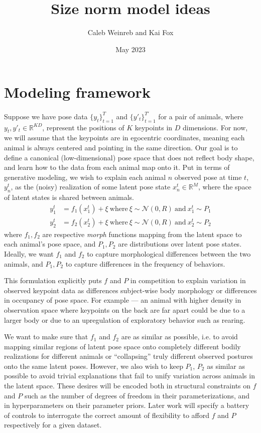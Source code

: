 \documentclass{article}         %
\title{Size norm model ideas}
\author{Caleb Weinreb and Kai Fox}
\date{May 2023}
\begin{document}
\maketitle

\section{Modeling framework}
\label{sec:model-fwk}

Suppose we have pose data $\{y_t\}_{t=1}^T$ and $\{y'_t\}_{t=1}^{T'}$ for a pair of animals, where $y_t, y'_t \in \mathbb{R}^{KD}$, represent the positions of $K$ keypoints in $D$ dimensions. For now, we will assume that the keypoints are in egocentric coordinates, meaning each animal is always centered and pointing in the same direction. Our goal is to define a canonical (low-dimensional) pose space that does not reflect body shape, and learn how to the data from each animal map onto it. Put in terms of generative modeling, we wish to explain each animal $n$ observed pose at time $t$, $y_n^t$, as the (noisy) realization of some latent pose state $x_n^t \in \mathbb{R}^M$, where the space of latent states is shared between animals.
%
\begin{align}
    y_1^t & = f_1(x_1^t) + \xi \ \text{where} \ 
    \xi \sim \mathcal{N}(0, R) \ \text{and} \ 
    x_1^t \sim P_1 \\
    y_2^t & = f_2(x_2^t) + \xi \ \text{where} \ 
    \xi \sim \mathcal{N}(0, R) \ \text{and} \ 
    x_2^t \sim P_2
\end{align}
%
where $f_1, f_2$ are respective \textit{morph} functions mapping from the latent space to each animal's pose space, and $P_1, P_2$ are distributions over latent pose states. Ideally, we want $f_1$ and $f_2$ to capture morphological differences between the two animals, and $P_1, P_2$ to capture differences in the frequency of behaviors.

This formulation explicitly puts $f$ and $P$ in competition to explain variation in observed keypoint data as differences subject-wise body morphology or differences in occupancy of pose space. For example --- an animal with higher density in observation space where keypoints on the back are far apart could be due to a larger body or due to an upregulation of exploratory behavior such as rearing.

We want to make sure that $f_1$ and $f_2$ are as similar as possible, i.e. to avoid mapping similar regions of latent pose space onto completely different bodily realizations for different animals or ``collapsing'' truly different observed postures onto the same latent poses. However, we also wish to keep $P_1$, $P_2$ as similar as possible to avoid trivial explanations that fail to unify variation across animals in the latent space. These desires will be encoded both in structural constraints on $f$ and $P$ such as the number of degrees of freedom in their parameterizations, and in hyperparameters on their parameter priors. Later work will specify a battery of controls to interrogate the correct amount of flexibility to afford $f$ and $P$ respectively for a given dataset.
\end{document}
